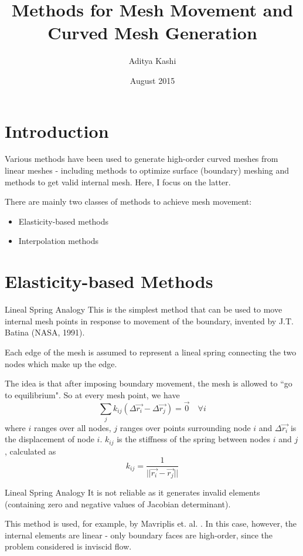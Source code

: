 \documentclass[mathserif]{beamer}
\title[Mesh Movement]{Methods for Mesh Movement and Curved Mesh Generation}
\author[Aditya Kashi]{{\Large Aditya Kashi} \institute[NCSU]{North Carolina State University}}
\date{August 2015}
\begin{document}
\frame{\titlepage}

\section{Introduction}
\begin{frame}
Various methods have been used to generate high-order curved meshes from linear meshes - including methods to optimize surface (boundary) meshing and methods to get valid internal mesh. Here, I focus on the latter.

There are mainly two classes of methods to achieve mesh movement:
\begin{itemize}
\item Elasticity-based methods
\item Interpolation methods
\end{itemize}
\end{frame}

\section{Elasticity-based Methods}

\begin{frame}{Lineal Spring Analogy}
This is the simplest method that can be used to move internal mesh points in response to movement of the boundary, invented by J.T. Batina (NASA, 1991).

Each edge of the mesh is assumed to represent a lineal spring connecting the two nodes which make up the edge.

The idea is that after imposing boundary movement, the mesh is allowed to ``go to equilibrium". So at every mesh point, we have
\begin{equation}
\sum_j k_{ij}(\Delta \vec{r_i} - \Delta \vec{r_j}) = \vec{0} \quad \forall i
\end{equation}
where $i$ ranges over all nodes, $j$ ranges over points surrounding node $i$ and $\Delta \vec{r_i}$ is the displacement of node $i$.
$k_{ij}$ is the stiffness of the spring between nodes $i$ and $j$, calculated as
\begin{equation}
k_{ij} = \frac{1}{||\vec{r_i} - \vec{r_j}||}
\end{equation}
\end{frame}

\begin{frame}{Lineal Spring Analogy}
It is not reliable as it generates invalid elements (containing zero and negative values of Jacobian determinant).

This method is used, for example, by Mavriplis et. al. \cite{mavriplis}. In this case, however, the internal elements are linear - only boundary faces are high-order, since the problem considered is inviscid flow.
\end{frame}
\end{document}
